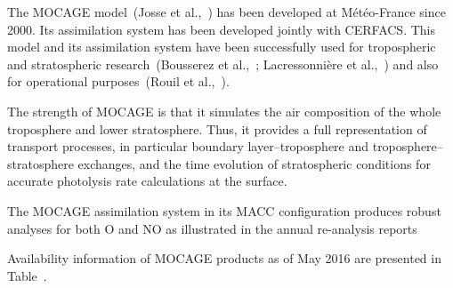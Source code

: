 \documentclass[9pt]{report}
\begin{document}
\noindent{}The MOCAGE model~(Josse et al.,~) has been developed at Météo-France since 2000.
Its assimilation system has been developed jointly with CERFACS.
This model and its assimilation system have been successfully used for tropospheric and stratospheric research~(Bousserez et al.,~; Lacressonni\`{e}re et al.,~) and also for operational purposes~(Rouil et al.,~).%

The strength of MOCAGE is that it simulates the air composition of the whole troposphere and lower stratosphere.
Thus, it provides a full representation of transport processes, in particular boundary layer–troposphere and troposphere–stratosphere exchanges, and the time evolution of stratospheric conditions for accurate photolysis rate calculations at the surface.%

The MOCAGE assimilation system in its MACC conﬁguration produces robust analyses for both O and NO as illustrated in the annual re-analysis reports %

Availability information of MOCAGE products as of May 2016 are presented in Table~.%
\end{document}
